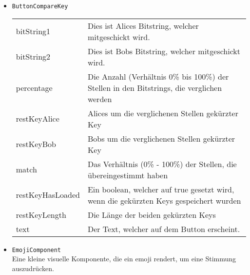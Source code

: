 \begin{itemize}
\begin{tabularx}{\textwidth}{p{3cm}p{11cm}}
\end{tabularx}
\item \texttt{ButtonCompareKey} \\
\begin{tabularx}{\textwidth}{p{3cm}p{11cm}} \\
bitString1 &  Dies ist Alices Bitstring, welcher mitgeschickt wird. \\
bitString2 &  Dies ist Bobs Bitstring, welcher mitgeschickt wird. \\
percentage &  Die Anzahl (Verhältnis 0\% bis 100\%) der Stellen in den Bitstrings, die verglichen werden \\
restKeyAlice &  Alices um die verglichenen Stellen gekürzter Key \\
restKeyBob &  Bobs um die verglichenen Stellen gekürzter Key \\
match & Das Verhältnis (0\% - 100\%) der Stellen, die übereingestimmt haben \\
restKeyHasLoaded &  Ein boolean, welcher auf true gesetzt wird, wenn die gekürzten Keys gespeichert wurden \\
restKeyLength &  Die Länge der beiden gekürzten Keys \\
text & Der Text, welcher auf dem Button erscheint.
\end{tabularx}
\item \texttt{EmojiComponent} \\
Eine kleine visuelle Komponente, die ein emoji rendert, um eine Stimmung auszudrücken.
\end{itemize}



